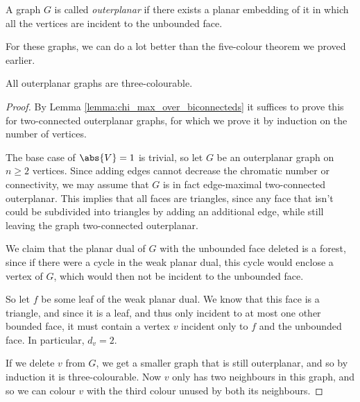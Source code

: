 \documentclass[nobib]{tufte-handout}
\begin{document}
\begin{definition}
  A graph $G$ is called \emph{outerplanar} if there exists a planar embedding of it in which all the vertices are incident to the unbounded face.
\end{definition}

For these graphs, we can do a lot better than the five-colour theorem we proved earlier.

\begin{theorem}
  All outerplanar graphs are three-colourable.

  \begin{proof}
    By Lemma \ref{lemma:chi_max_over_biconnecteds} it suffices to prove this for two-connected outerplanar graphs, for which we prove it by induction on the number of vertices. 
    
    The base case of $\abs{V} = 1$ is trivial, so let $G$ be an outerplanar graph on $n \geq 2$ vertices. Since adding edges cannot decrease the chromatic number or connectivity, we may assume that $G$ is in fact edge-maximal two-connected outerplanar. This implies that all faces are triangles, since any face that isn't could be subdivided into triangles by adding an additional edge, while still leaving the graph two-connected outerplanar.

    We claim that the planar dual of $G$ with the unbounded face deleted is a forest, since if there were a cycle in the weak planar dual, this cycle would enclose a vertex of $G$, which would then not be incident to the unbounded face.

    So let $f$ be some leaf of the weak planar dual. We know that this face is a triangle, and since it is a leaf, and thus only incident to at most one other bounded face, it must contain a vertex $v$ incident only to $f$ and the unbounded face. In particular, $d_v = 2$.

    If we delete $v$ from $G$, we get a smaller graph that is still outerplanar, and so by induction it is three-colourable. Now $v$ only has two neighbours in this graph, and so we can colour $v$ with the third colour unused by both its neighbours.
  \end{proof}
\end{theorem}
\end{document}
